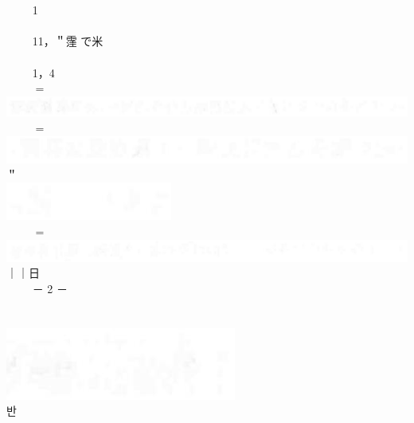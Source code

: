 \documentclass[10pt]{article}
\begin{document}
$\qquad$\\
$\qquad$\\
$\qquad$ 1\\
$\qquad$\\
$\qquad$ 11，＂䨟 で米\\
$\qquad$\\
$\qquad$ 1，4\\
$\qquad$ $=$\\
\includegraphics[max width=\textwidth, center]{2025_06_06_704745ea57b15b2333e5g-111}\\
$\qquad$ $=$\\
\includegraphics[max width=\textwidth]{2025_06_06_704745ea57b15b2333e5g-111(21)} ＂ $\qquad$\\
\includegraphics[max width=\textwidth, center]{2025_06_06_704745ea57b15b2333e5g-111(3)}\\
$\qquad$ $=$\\
\includegraphics[max width=\textwidth]{2025_06_06_704745ea57b15b2333e5g-111(8)} ｜｜日 $\qquad$\\
$\qquad$ － 2 － $\qquad$\\
$\qquad$\\
$\qquad$\\
\includegraphics[max width=\textwidth, center]{2025_06_06_704745ea57b15b2333e5g-111(6)}\\
반
\end{document}
